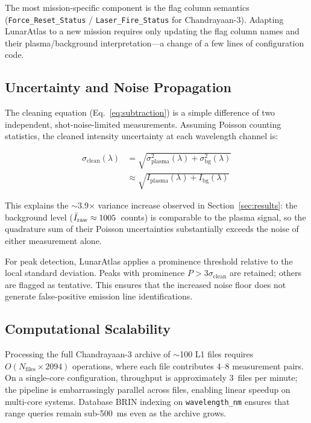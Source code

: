 \documentclass[a4paper,twocolumn,10pt]{article}
\begin{document}
The most mission-specific component is the flag column semantics
(\texttt{Force\_Reset\_Status} / \texttt{Laser\_Fire\_Status} for
Chandrayaan-3).  Adapting LunarAtlas to a new mission requires only
updating the flag column names and their
plasma/background interpretation---a change of a few lines of
configuration code.

\subsection{Uncertainty and Noise Propagation}

The cleaning equation (Eq.~\ref{eq:subtraction}) is a simple
difference of two independent, shot-noise-limited measurements.
Assuming Poisson counting statistics, the cleaned intensity
uncertainty at each wavelength channel is:

\begin{equation}
\label{eq:uncertainty}
\begin{split}
\sigma_{\text{clean}}(\lambda) &=
  \sqrt{\sigma_{\text{plasma}}^2(\lambda)
  + \sigma_{\text{bg}}^2(\lambda)} \\
  &\approx \sqrt{I_{\text{plasma}}(\lambda)
  + I_{\text{bg}}(\lambda)}
\end{split}
\end{equation}

This explains the $\sim$3.9$\times$ variance increase observed in
Section~\ref{sec:results}: the background level ($\bar{I}_{\rm raw}
\approx 1005$~counts) is comparable to the plasma signal, so
the quadrature sum of their Poisson uncertainties substantially
exceeds the noise of either measurement alone.

For peak detection, LunarAtlas applies a prominence threshold
relative to the local standard deviation.  Peaks with prominence
$P > 3\sigma_{\text{clean}}$ are retained; others are flagged as
tentative.  This ensures that the increased noise floor does not
generate false-positive emission line identifications.

\subsection{Computational Scalability}

Processing the full Chandrayaan-3 archive of $\sim$100 L1 files
requires $O(N_{\text{files}} \times 2094)$ operations, where each
file contributes 4--8 measurement pairs.  On a single-core
configuration, throughput is approximately 3~files per minute;
the pipeline is embarrassingly parallel across files, enabling
linear speedup on multi-core systems.  Database BRIN indexing
on \texttt{wavelength\_nm} ensures that range queries remain
sub-\SI{500}{\milli\second} even as the archive grows.
\end{document}
